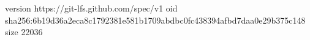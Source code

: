 version https://git-lfs.github.com/spec/v1
oid sha256:6b19d36a2eca8c1792381e581b1709abdbc0fc438394afbd7daa0e29b375c148
size 22036
